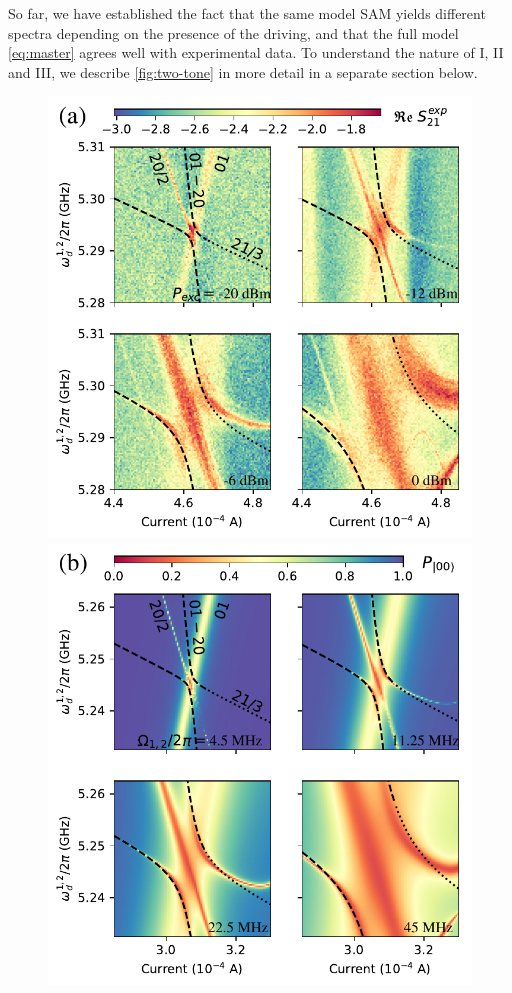 \documentclass[%
 aps, prx,
 amsmath,amssymb,
 reprint,%
superscriptaddress
]{revtex4-2}
\begin{document}
So far, we have established the fact that the 
same model SAM yields different spectra depending 
on the presence of the driving, and that the full 
model \autoref{eq:master} agrees well with 
experimental data. To understand the nature of I, 
II and III, we describe \autoref{fig:two-tone} in 
more detail in a separate section below.

\begin{figure}
	\includegraphics[width=.49\linewidth]{powerscan}
	\includegraphics[width=.49\linewidth]{zoom2_picture}
	

\end{figure}
\end{document}
